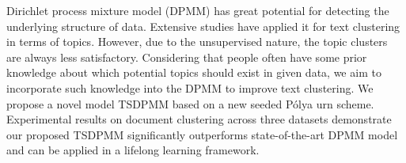 Dirichlet process mixture model (DPMM) has great potential for detecting the underlying structure of data. {Extensive studies have applied it for text clustering in terms of topics.} However, due to the unsupervised nature, the topic clusters are always less satisfactory. Considering that people often have some prior knowledge about which potential topics should exist in given data, we aim to incorporate such knowledge into the DPMM to improve text clustering. We propose a novel model TSDPMM based on a new seeded P\'olya urn scheme. Experimental results on document clustering  across three datasets demonstrate our proposed TSDPMM significantly outperforms state-of-the-art DPMM model and can be applied in a lifelong learning framework.
